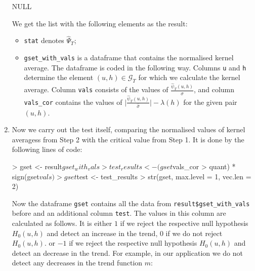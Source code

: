 \documentclass[a4paper]{article}
\begin{document}
\begin{enumerate}[label=\textit{Step \arabic*.}, leftmargin=1.45cm]
\begin{Schunk}
\begin{Soutput}
NULL
\end{Soutput}
\end{Schunk}
We get the list with the following elements as the result:
\begin{itemize}
\item \verb|stat| denotes $\widehat{\Psi}_{T}$;
\item \verb|gset_with_vals| is a dataframe that contains the normalised kernel average. The dataframe is coded in the following way. Columns \verb|u| and \verb|h| determine the element $(u, h) \in {}_T$ for which we calculate the kernel average. Column \verb|vals| consists of the values of
$$, and column \verb|vals_cor| contains the values of $\Big|\Big| - \lambda(h)$ for the given pair $(u, h)$.
\end{itemize}

\item Now we carry out the test itself, comparing the normalised values of kernel averagess from Step 2 with the critical value from Step 1. It is done by the following lines of code:
\begin{Schunk}
\begin{Sinput}
> gset         <- result$gset_with_vals
> test_results <- (gset$vals_cor > quant) * sign(gset$vals)
> gset$test    <- test_results
> str(gset, max.level = 1, vec.len = 2)
\end{Sinput}
\end{Schunk}

Now the dataframe \verb|gset| contains all the data from \linebreak \verb|result$gset_with_vals| before and an additional column \verb|test|. The values in this column are calculated as follows. It is either $1$ if we reject the respective null hypothesis $H_0(u, h)$ and detect an increase in the trend, $0$ if we do not reject $H_0(u, h)$. or $-1$ if we reject the respective null hypothesis $H_0(u, h)$ and detect an decrease in the trend. For example, in our application we do not detect any decreases in the trend function $m$:


\end{enumerate}
\end{document}
